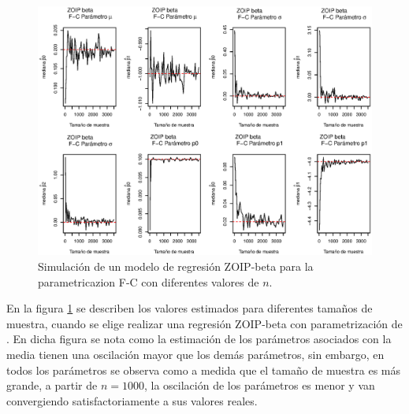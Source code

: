 \begin{figure}
	\begin{center}
		\includegraphics[scale=0.5]{Converg_FC.eps}	
		\caption{Simulaci\'{o}n de un modelo de regresi\'{o}n ZOIP-beta para la parametricazion F-C con diferentes valores de $n$.}
		\label{Simu_FC}
	\end{center}
\end{figure}

En la figura \ref{Simu_FC} se describen los valores estimados para diferentes tama\~{n}os de muestra, cuando se elige realizar una regresi\'{o}n ZOIP-beta con parametrizaci\'{o}n de \cite{Ferrari2}. En dicha figura se nota como la estimaci\'{o}n de los par\'{a}metros asociados con la media tienen una oscilaci\'{o}n mayor que los dem\'{a}s par\'{a}metros, sin embargo, en todos los par\'{a}metros se observa como a medida que el tama\~{n}o de muestra es m\'{a}s grande, a partir de $n=1000$, la oscilaci\'{o}n de los par\'{a}metros es menor y van convergiendo satisfactoriamente a sus valores reales.\\


